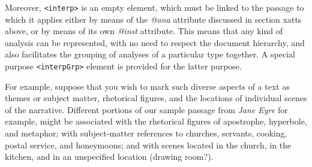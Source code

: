 \documentclass[11pt,twoside]{article}\makeatletter
\begin{document}
Moreover, \texttt{<interp>}  is an empty element, which must be linked to the passage to which it applies either by means of the \textit{@ana}  attribute discussed in section xatts  above, or by means of its own \textit{@inst} attribute. This means that any kind of analysis can be represented, with no need to respect the document hierarchy, and also facilitates the grouping of analyses of a particular type together. A special purpose \texttt{<interpGrp>} element is provided for the latter purpose.\par
For example, suppose that you wish to mark such diverse aspects of a text as  themes or subject matter, rhetorical figures, and the locations of individual scenes of the narrative. Different portions of our sample passage from \textit{Jane Eyre} for example, might be associated with the rhetorical figures of apostrophe, hyperbole, and metaphor; with subject-matter references to churches, servants, cooking, postal service, and honeymoons; and with scenes located in the church, in the kitchen, and in an unspecified location (drawing room?).\par
\end{document}
